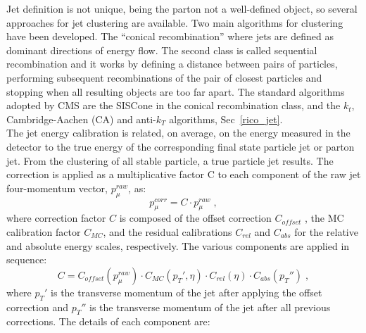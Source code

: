 Jet definition is not unique, being the parton not a well-defined object, so several
approaches for jet clustering are available. Two main algorithms for clustering have been developed. The ``conical recombination''
where jets are defined as dominant directions of energy flow.  The second class is called sequential recombination and it works by defining a distance
between pairs of particles, performing subsequent recombinations of the pair of closest
particles and stopping when all resulting objects are too far apart. The standard algorithms adopted by
CMS are the SISCone in the conical recombination class, and the $k_t$, Cambridge-Aachen (CA) and anti-$k_T$ algorithms, Sec~\ref{rico_jet}.\\
\newline
The jet energy calibration is related,  on average, on the energy measured in
the detector to the true energy of the corresponding final state particle jet or parton jet.
From the clustering  of all stable particle, a true particle jet results. The correction is applied as
a multiplicative factor C to each component of the raw jet four-momentum vector, $p_{\mu}^{raw}$, as:
\newline
\begin{equation}
p_{\mu}^{corr}=C \cdot p_{\mu}^{raw} \; ,
\end{equation}
where correction factor $C$ is composed of the offset correction $C_{offset}$ , the MC calibration
factor $C_{MC}$, and the residual calibrations $C_{rel}$ and $C_{abs}$ for the relative and absolute
energy scales, respectively. The various components are applied in sequence:
\newline
\begin{equation}
C=   C_{offset} ( p_{\mu}^{raw}) \cdot  C_{MC} (p_T',\eta) \cdot C_{rel}(\eta) \cdot  C_{abs} (p_T'') \; ,
\end{equation}
\newline
where $p_T'$ is the transverse momentum of the jet after applying the offset correction and $p_T''$ is the transverse momentum 
of the jet after all previous corrections. The details of each component are:
